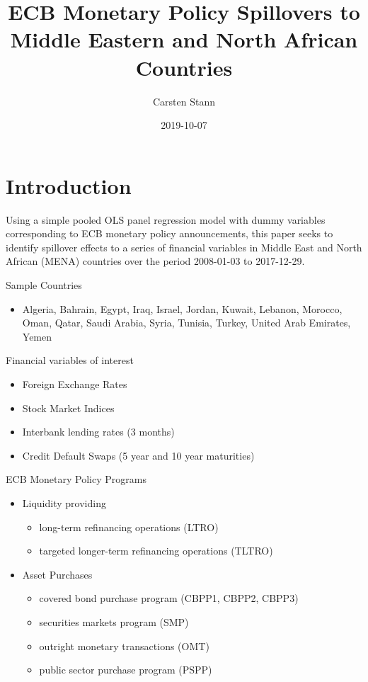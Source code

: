 \documentclass[a4paper]{article}
\title{ECB Monetary Policy Spillovers to Middle Eastern and North African Countries}
\author{Carsten Stann}
\date{2019-10-07}
\begin{document}
\maketitle

\section{Introduction}

Using a simple pooled OLS panel regression model with dummy variables corresponding to ECB monetary policy announcements, this paper seeks to identify spillover effects to a series of financial variables in Middle East and North African (MENA) countries over the period 2008-01-03 to 2017-12-29.

Sample Countries
\begin{itemize}
   	\item Algeria, Bahrain, Egypt, Iraq, Israel, Jordan, Kuwait, Lebanon, Morocco, Oman, Qatar, Saudi Arabia, Syria, Tunisia, Turkey, United Arab Emirates, Yemen
\end{itemize}

Financial variables of interest
\begin{itemize}
	\setlength\itemsep{0em}
	\item Foreign Exchange Rates
	\item Stock Market Indices
	\item Interbank lending rates (3 months)
	\item Credit Default Swaps (5 year and 10 year maturities)
\end{itemize}
   
ECB Monetary Policy Programs
\begin{itemize}
	\item Liquidity providing
		\begin{itemize}
			\item long-term refinancing operations (LTRO)
			\item targeted longer-term refinancing operations (TLTRO)
		\end{itemize}
	\item Asset Purchases
		\begin{itemize}
			\item covered bond purchase program (CBPP1, CBPP2, CBPP3)
			\item securities markets program (SMP)
			\item outright monetary transactions (OMT)
			\item public sector purchase program (PSPP)
		\end{itemize}
	\end{itemize}
	
\end{document}
